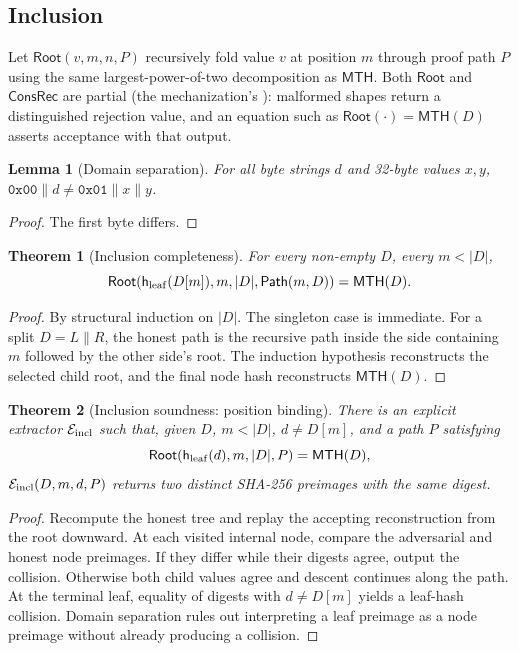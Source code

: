 \documentclass[11pt]{article}
\newtheorem{theorem}{Theorem}
\newtheorem{lemma}{Lemma}
\theoremstyle{remark}
\newcommand{\hleaf}{\mathsf{h}_{\rm leaf}}
\newcommand{\MTH}{\mathsf{MTH}}
\newcommand{\Root}{\mathsf{Root}}
\newcommand{\Path}{\mathsf{Path}}
\newcommand{\ConsRec}{\mathsf{ConsRec}}
\newcommand{\code}[1]{\texttt{\detokenize{#1}}}
\begin{document}
\subsection{Inclusion}

Let $\Root(v,m,n,P)$ recursively fold value $v$ at position $m$ through proof
path $P$ using the same largest-power-of-two decomposition as $\MTH$. Both
$\Root$ and $\ConsRec$ are partial (the mechanization's \code{Option}):
malformed shapes return a distinguished rejection value, and an equation such
as $\Root(\cdot)=\MTH(D)$ asserts acceptance with that output.

\begin{lemma}[Domain separation]
For all byte strings $d$ and 32-byte values $x,y$,
$\mathtt{0x00}\parallel d \neq \mathtt{0x01}\parallel x\parallel y$.
\end{lemma}
\begin{proof}
The first byte differs.
\end{proof}

\begin{theorem}[Inclusion completeness]
For every non-empty $D$, every $m<|D|$,
\[
\Root(\hleaf(D[m]),m,|D|,\Path(m,D))=\MTH(D).
\]
\end{theorem}
\begin{proof}
By structural induction on $|D|$. The singleton case is immediate. For a split
$D=L\|R$, the honest path is the recursive path inside the side containing $m$
followed by the other side's root. The induction hypothesis reconstructs the
selected child root, and the final node hash reconstructs $\MTH(D)$.
\end{proof}

\begin{theorem}[Inclusion soundness: position binding]
There is an explicit extractor $\mathcal{E}_{\rm incl}$ such that, given $D$,
$m<|D|$, $d\neq D[m]$, and a path $P$ satisfying
\[
\Root(\hleaf(d),m,|D|,P)=\MTH(D),
\]
$\mathcal{E}_{\rm incl}(D,m,d,P)$ returns two distinct SHA-256 preimages with
the same digest.
\end{theorem}
\begin{proof}
Recompute the honest tree and replay the accepting reconstruction from the root
downward. At each visited internal node, compare the adversarial and honest
node preimages. If they differ while their digests agree, output the collision.
Otherwise both child values agree and descent continues along the path. At the
terminal leaf, equality of digests with $d\neq D[m]$ yields a leaf-hash
collision. Domain separation rules out interpreting a leaf preimage as a node
preimage without already producing a collision.
\end{proof}
\end{document}

